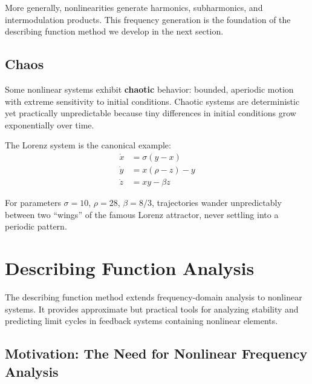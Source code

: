 More generally, nonlinearities generate harmonics, subharmonics, and intermodulation products. This frequency generation is the foundation of the describing function method we develop in the next section.

\subsection{Chaos}

Some nonlinear systems exhibit \textbf{chaotic} behavior: bounded, aperiodic motion with extreme sensitivity to initial conditions. Chaotic systems are deterministic yet practically unpredictable because tiny differences in initial conditions grow exponentially over time.

The Lorenz system is the canonical example:
\begin{align}
\dot{x} &= \sigma(y - x) \\
\dot{y} &= x(\rho - z) - y \\
\dot{z} &= xy - \beta z
\end{align}

For parameters $\sigma = 10$, $\rho = 28$, $\beta = 8/3$, trajectories wander unpredictably between two ``wings'' of the famous Lorenz attractor, never settling into a periodic pattern.


\section{Describing Function Analysis}
\label{sec:describing_function}

The describing function method extends frequency-domain analysis to nonlinear systems. It provides approximate but practical tools for analyzing stability and predicting limit cycles in feedback systems containing nonlinear elements.

\subsection{Motivation: The Need for Nonlinear Frequency Analysis}

